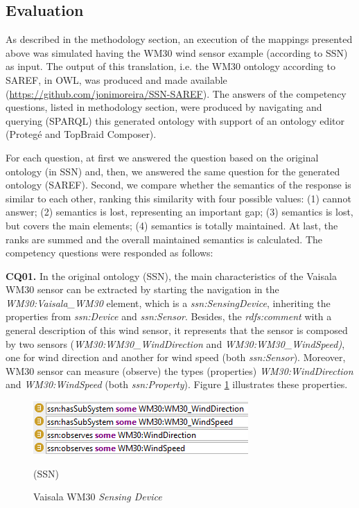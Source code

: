 \documentclass{sig-alternate-05-2015}
\begin{document}
\subsection{Evaluation}
As described in the methodology section, an execution of the mappings presented above was simulated having the WM30 wind sensor example (according to SSN) as input. The output of this translation, i.e. the WM30 ontology according to SAREF, in OWL, was produced and made available (\url{https://github.com/jonimoreira/SSN-SAREF}). The answers of the competency questions, listed in methodology section, were produced by navigating and querying (SPARQL) this generated ontology with support of an ontology editor (Protegé and TopBraid Composer). 

For each question, at first we answered the question based on the original ontology (in SSN) and, then, we answered the same question for the generated ontology (SAREF). Second, we compare whether the semantics of the response is similar to each other, ranking this similarity with four possible values: (1) cannot answer; (2) semantics is lost, representing an important gap; (3) semantics is lost, but covers the main elements; (4) semantics is totally maintained. At last, the ranks are summed and the overall maintained semantics is calculated.
The competency questions were responded as follows:

\textbf{CQ01.} In the original ontology (SSN), the main characteristics of the Vaisala WM30 sensor can be extracted by starting the navigation in the \textit{WM30:Vaisala\_WM30} element, which is a \textit{ssn:SensingDevice}, inheriting the properties from \textit{ssn:Device} and \textit{ssn:Sensor}. Besides, the \textit{rdfs:comment} with a general description of this wind sensor, it represents that the sensor is composed by two sensors (\textit{WM30:WM30\_WindDirection} and \textit{WM30:WM30\_WindSpeed)}, one for wind direction and another for wind speed (both \textit{ssn:Sensor}). Moreover, WM30 sensor can measure (observe) the types (properties) \textit{WM30:WindDirection} and \textit{WM30:WindSpeed} (both \textit{ssn:Property}). Figure \ref{fig:SSN_SystemProperties} illustrates these properties.

\begin{figure}[h!]
\centering
\includegraphics[scale=0.98]{SSN_SystemProperties}
\caption{Vaisala WM30 \textit{Sensing Device}} (SSN)
\label{fig:SSN_SystemProperties}
\end{figure}
\end{document}
